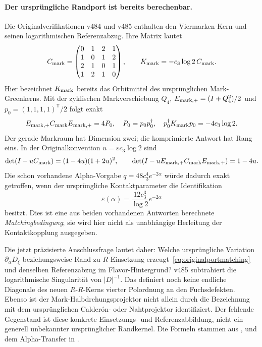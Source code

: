 \paragraph{Der ursprüngliche Randport ist bereits berechenbar.}
Die Originalverifikationen v484 und v485 enthalten den Viermarken-Kern
und seinen logarithmischen Referenzabzug. Ihre Matrix lautet
\[
 C_{\rm mark}=\begin{pmatrix}
 0&1&2&1\\1&0&1&2\\2&1&0&1\\1&2&1&0
 \end{pmatrix},\qquad
 K_{\rm mark}=-c_3\log2\,C_{\rm mark}.
\]
Hier bezeichnet $K_{\rm mark}$ bereits das Orbitmittel des ursprünglichen
Mark-Greenkerns. Mit der zyklischen Markverschiebung $Q_4$,
$E_{\rm mark,+}=(I+Q_4^2)/2$ und $p_0=(1,1,1,1)^{\mathsf T}/2$ folgt exakt
\[
 E_{\rm mark,+}C_{\rm mark}E_{\rm mark,+}=4P_0,\quad
 P_0=p_0p_0^\dagger,\quad
 p_0^\dagger K_{\rm mark}p_0=-4c_3\log2.
\]
Der gerade Markraum hat Dimension zwei; die komprimierte Antwort hat Rang eins.
In der Originalkonvention $u=\varepsilon c_3\log2$ sind
\begin{equation}
 \det(I-uC_{\rm mark})=(1-4u)(1+2u)^2,\qquad
 \det(I-uE_{\rm mark,+}C_{\rm mark}E_{\rm mark,+})=1-4u.
\end{equation}
Die schon vorhandene Alpha-Vorgabe $q=48c_3^4e^{-2\alpha}$ würde dadurch
exakt getroffen, wenn der ursprüngliche Kontaktparameter die Identifikation
\begin{equation}\label{eq:originalportmatching}
 \boxed{\varepsilon(\alpha)=\frac{12c_3^3}{\log2}e^{-2\alpha}}
\end{equation}
besitzt. Dies ist eine aus beiden vorhandenen Antworten berechnete
\emph{Matchingbedingung}; sie wird hier nicht als unabhängige Herleitung der
Kontaktkopplung ausgegeben.

Die jetzt präzisierte Anschlussfrage lautet daher: Welche ursprüngliche
Variation $\partial_\alpha D_\xi$ beziehungsweise Rand-zu-$R$-Einsetzung
erzeugt~\eqref{eq:originalportmatching} und denselben Referenzabzug im
Flavor-Hintergrund? v485 subtrahiert die logarithmische Singularität von
$|D|^{-1}$. Das definiert noch keine endliche Diagonale des neuen
$R$-$R$-Kerns vierter Polordnung an den Fuchsdefekten.
Ebenso ist der Mark-Halbdrehungsprojektor nicht allein durch die Bezeichnung
mit dem ursprünglichen Calderón- oder Nahtprojektor identifiziert.
Der fehlende Gegenstand ist diese konkrete Einsetzungs- und
Referenzabbildung, nicht ein generell unbekannter ursprünglicher Randkernel.
Die Formeln stammen aus ,
 und dem
Alpha-Transfer in .

